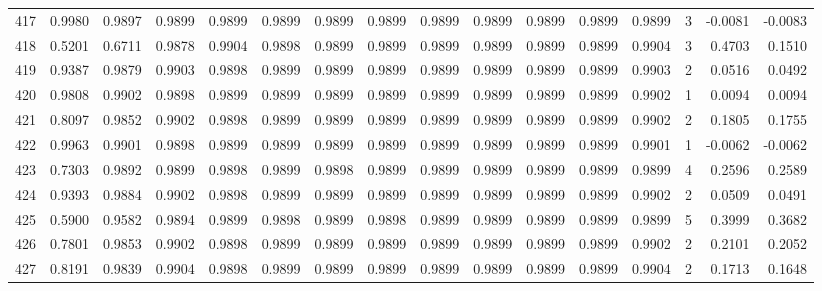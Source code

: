 \begin{tabular}{lrrrrrrrrrrrrrrr}
417 &      0.9980 &  0.9897 &  0.9899 &  0.9899 &  0.9899 &  0.9899 &  0.9899 &  0.9899 &  0.9899 &  0.9899 &   0.9899 &     0.9899 &      3 &                   -0.0081 &                    -0.0083 \\
418 &      0.5201 &  0.6711 &  0.9878 &  0.9904 &  0.9898 &  0.9899 &  0.9899 &  0.9899 &  0.9899 &  0.9899 &   0.9899 &     0.9904 &      3 &                    0.4703 &                     0.1510 \\
419 &      0.9387 &  0.9879 &  0.9903 &  0.9898 &  0.9899 &  0.9899 &  0.9899 &  0.9899 &  0.9899 &  0.9899 &   0.9899 &     0.9903 &      2 &                    0.0516 &                     0.0492 \\
420 &      0.9808 &  0.9902 &  0.9898 &  0.9899 &  0.9899 &  0.9899 &  0.9899 &  0.9899 &  0.9899 &  0.9899 &   0.9899 &     0.9902 &      1 &                    0.0094 &                     0.0094 \\
421 &      0.8097 &  0.9852 &  0.9902 &  0.9898 &  0.9899 &  0.9899 &  0.9899 &  0.9899 &  0.9899 &  0.9899 &   0.9899 &     0.9902 &      2 &                    0.1805 &                     0.1755 \\
422 &      0.9963 &  0.9901 &  0.9898 &  0.9899 &  0.9899 &  0.9899 &  0.9899 &  0.9899 &  0.9899 &  0.9899 &   0.9899 &     0.9901 &      1 &                   -0.0062 &                    -0.0062 \\
423 &      0.7303 &  0.9892 &  0.9899 &  0.9898 &  0.9899 &  0.9898 &  0.9899 &  0.9899 &  0.9899 &  0.9899 &   0.9899 &     0.9899 &      4 &                    0.2596 &                     0.2589 \\
424 &      0.9393 &  0.9884 &  0.9902 &  0.9898 &  0.9899 &  0.9899 &  0.9899 &  0.9899 &  0.9899 &  0.9899 &   0.9899 &     0.9902 &      2 &                    0.0509 &                     0.0491 \\
425 &      0.5900 &  0.9582 &  0.9894 &  0.9899 &  0.9898 &  0.9899 &  0.9898 &  0.9899 &  0.9899 &  0.9899 &   0.9899 &     0.9899 &      5 &                    0.3999 &                     0.3682 \\
426 &      0.7801 &  0.9853 &  0.9902 &  0.9898 &  0.9899 &  0.9899 &  0.9899 &  0.9899 &  0.9899 &  0.9899 &   0.9899 &     0.9902 &      2 &                    0.2101 &                     0.2052 \\
427 &      0.8191 &  0.9839 &  0.9904 &  0.9898 &  0.9899 &  0.9899 &  0.9899 &  0.9899 &  0.9899 &  0.9899 &   0.9899 &     0.9904 &      2 &                    0.1713 &                     0.1648 \\

\end{tabular}
